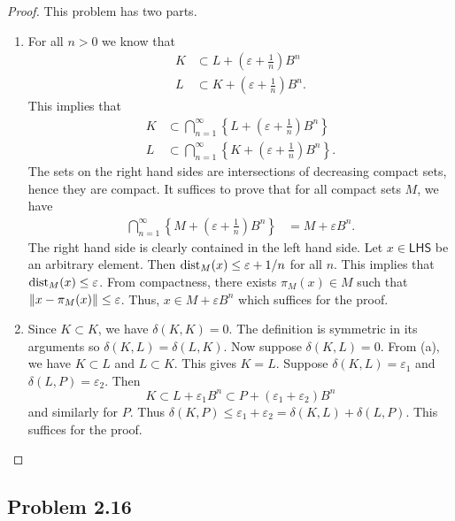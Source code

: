 \documentclass[12pt]{article}
\begin{document}
\begin{proof}
	This problem has two parts. 
	\begin{enumerate}[label = (\alph*)]
		\item For all $n > 0$ we know that 
		\begin{align*}
			K & \subset L + \left ( \varepsilon + \frac{1}{n} \right) B^n \\
			L & \subset K + \left ( \varepsilon + \frac{1}{n} \right) B^n.
		\end{align*}
		This implies that 
		\begin{align*}
			 K & \subset \bigcap_{n = 1}^\infty \left \{ L + \left ( \varepsilon + \frac{1}{n} \right )B^n \right \} \\
			 L & \subset \bigcap_{n = 1}^\infty \left \{ K + \left ( \varepsilon + \frac{1}{n} \right )B^n \right \}.
		\end{align*}
		The sets on the right hand sides are intersections of decreasing compact sets, hence they are compact. It suffices to prove that for all compact sets $M$, we have 
		\begin{align*}
			\bigcap_{n = 1}^\infty \left \{ M + \left ( \varepsilon + \frac{1}{n} \right )B^n \right \} & = M + \varepsilon B^n.
		\end{align*}
		The right hand side is clearly contained in the left hand side. Let $x \in \mathsf{LHS}$ be an arbitrary element. Then $\operatorname{dist}_M(x) \leq \varepsilon + 1/n$ for all $n$. This implies that $\operatorname{dist}_M(x) \leq \varepsilon$. From compactness, there exists $\pi_M(x) \in M$ such that $\left\lVert x - \pi_M(x)\right\rVert \leq \varepsilon$. Thus, $x \in M + \varepsilon B^n$ which suffices for the proof. 

		\item Since $K \subset K$, we have $\delta(K, K) = 0$. The definition is symmetric in its arguments so $\delta(K, L) = \delta(L, K)$. Now suppose $\delta(K, L) = 0$. From (a), we have $K \subset L $ and $L \subset K$. This gives $K = L$. Suppose $\delta (K, L) = \varepsilon_1$ and $\delta(L, P) = \varepsilon_2$. Then 
		\[
			K \subset L + \varepsilon_1 B^n \subset P + (\varepsilon_1 + \varepsilon_2) B^n
		\]
		and similarly for $P$. Thus $\delta(K, P) \leq \varepsilon_1 + \varepsilon_2 = \delta(K, L) + \delta(L, P)$. This suffices for the proof. 
	\end{enumerate}
\end{proof}

\newpage 

\subsection{Problem 2.16}
\end{document}
